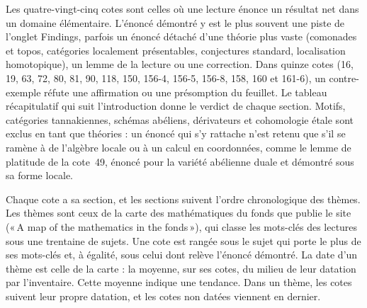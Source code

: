 \documentclass[11pt]{article}
\newcommand{\q}[1]{«\,#1\,»}
\theoremstyle{plain}
\theoremstyle{definition}
\theoremstyle{plain}
\theoremstyle{definition}
\theoremstyle{remark}
\renewcommand{\_}{\bkunderscore\allowbreak}
\begin{document}
Les quatre-vingt-cinq cotes sont celles où une lecture énonce un résultat net dans un domaine élémentaire. L'énoncé démontré y est le plus souvent une piste de l'onglet Findings, parfois un énoncé détaché d'une théorie plus vaste (comonades et topos, catégories localement présentables, conjectures standard, localisation homotopique), un lemme de la lecture ou une correction. Dans quinze cotes (16, 19, 63, 72, 80, 81, 90, 118, 150, 156-4, 156-5, 156-8, 158, 160 et 161-6), un contre-exemple réfute une affirmation ou une présomption du feuillet. Le tableau récapitulatif qui suit l'introduction donne le verdict de chaque section. Motifs, catégories tannakiennes, schémas abéliens, dérivateurs et cohomologie étale sont exclus en tant que théories : un énoncé qui s'y rattache n'est retenu que s'il se ramène à de l'algèbre locale ou à un calcul en coordonnées, comme le lemme de platitude de la cote~49, énoncé pour la variété abélienne duale et démontré sous sa forme locale.

Chaque cote a sa section, et les sections suivent l'ordre chronologique des thèmes. Les thèmes sont ceux de la carte des mathématiques du fonds que publie le site (\q{A map of the mathematics in the fonds}), qui classe les mots-clés des lectures sous une trentaine de sujets. Une cote est rangée sous le sujet qui porte le plus de ses mots-clés et, à égalité, sous celui dont relève l'énoncé démontré. La date d'un thème est celle de la carte : la moyenne, sur ses cotes, du milieu de leur datation par l'inventaire. Cette moyenne indique une tendance. Dans un thème, les cotes suivent leur propre datation, et les cotes non datées viennent en dernier.
\end{document}
